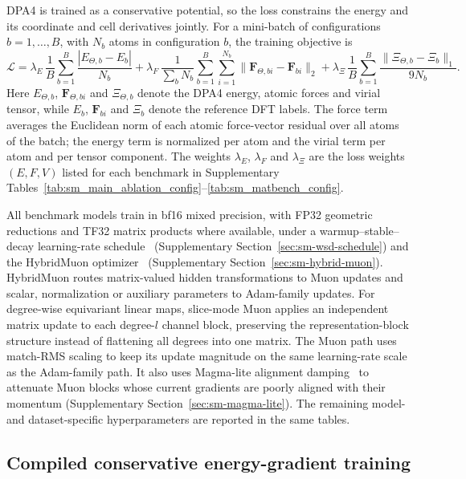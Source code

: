 DPA4 is trained as a conservative potential, so the loss constrains the energy and its coordinate and cell derivatives jointly.
For a mini-batch of configurations $b=1,\ldots,B$, with $N_b$ atoms in configuration $b$, the training objective is
\begin{equation}
    \mathcal{L}
    = \lambda_E\,\frac{1}{B}\sum_{b=1}^{B}\frac{|E_{\Theta,b}-E_b|}{N_b}
    + \lambda_F\,\frac{1}{\sum_{b}N_b}\sum_{b=1}^{B}\sum_{i=1}^{N_b}\bigl\|\mathbf{F}_{\Theta,bi}-\mathbf{F}_{bi}\bigr\|_2
    + \lambda_\Xi\,\frac{1}{B}\sum_{b=1}^{B}\frac{\bigl\|\Xi_{\Theta,b}-\Xi_b\bigr\|_1}{9N_b}.
    \label{eq:dpa4-loss}
\end{equation}
Here $E_{\Theta,b}$, $\mathbf{F}_{\Theta,bi}$ and $\Xi_{\Theta,b}$ denote the DPA4 energy, atomic forces and virial tensor, while $E_b$, $\mathbf{F}_{bi}$ and $\Xi_b$ denote the reference DFT labels.
The force term averages the Euclidean norm of each atomic force-vector residual over all atoms of the batch; the energy term is normalized per atom and the virial term per atom and per tensor component.
The weights $\lambda_E$, $\lambda_F$ and $\lambda_\Xi$ are the loss weights $(E,F,V)$ listed for each benchmark in Supplementary Tables~\ref{tab:sm_main_ablation_config}--\ref{tab:sm_matbench_config}.

All benchmark models train in bf16 mixed precision, with FP32 geometric reductions and TF32 matrix products where available, under a warmup--stable--decay learning-rate schedule~\cite{wen2024wsd} (Supplementary Section~\ref{sec:sm-wsd-schedule}) and the HybridMuon optimizer~\cite{jordan2024muon,liu2025muon} (Supplementary Section~\ref{sec:sm-hybrid-muon}).
HybridMuon routes matrix-valued hidden transformations to Muon updates and scalar, normalization or auxiliary parameters to Adam-family updates.
For degree-wise equivariant linear maps, slice-mode Muon applies an independent matrix update to each degree-$l$ channel block, preserving the representation-block structure instead of flattening all degrees into one matrix.
The Muon path uses match-RMS scaling to keep its update magnitude on the same learning-rate scale as the Adam-family path.
It also uses Magma-lite alignment damping~\cite{joo2026magma} to attenuate Muon blocks whose current gradients are poorly aligned with their momentum (Supplementary Section~\ref{sec:sm-magma-lite}).
The remaining model- and dataset-specific hyperparameters are reported in the same tables.

\subsection{Compiled conservative energy-gradient training}
\label{sec:compiled-training}

